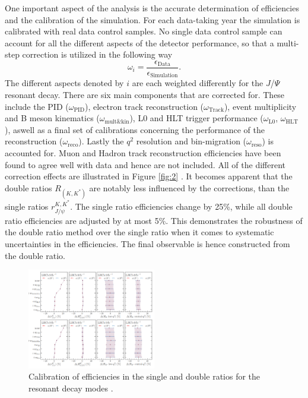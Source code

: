 \documentclass[%
 reprint,
 amsmath,amssymb,
 aps,
]{revtex4-2}
\begin{document}
One important aspect of the analysis is the accurate determination of efficiencies and the calibration of the simulation. For each data-taking year
the simulation is calibrated with real data control samples. No single data control sample can account for all the different aspects of the detector 
performance, so that a multi-step correction is utilized \cite{hier1,hier2} in the following way
\begin{equation*}
\omega_i = \frac{\epsilon_{\text{Data}}}{\epsilon_{\text{Simulation}}}.
\end{equation*}
The different aspects denoted by $i$ are each weighted differently for the $J$/$\Psi$ resonant decay. There are six main components that are corrected for. These 
include the PID ($\omega_{\text{PID}}$), electron track reconstruction ($\omega_{\text{Track}}$), event multiplicity and B meson kinematics ($\omega_{\text{mult}\&\text{kin}}$),
 L0 and HLT trigger performance ($\omega_{\text{L}0}$, $\omega_{\text{HLT}}$), aswell as a final set of calibrations concerning the performance of the reconstruction ($\omega_{\text{reco}}$).
Lastly the $q^2$ resolution and bin-migration ($\omega_{\text{reso}}$) is accounted for.
Muon and Hadron track reconstruction efficiencies have been found to agree well with data and hence are not included. 
All of the different correction effects are illustrated in Figure \ref{fig:2} . It becomes apparent that the double ratios $R_{\left(K, K^*\right)}$ are notably
less influenced by the corrections, than the single ratios  $r_{J / \psi}^{K, K^*}$. The single ratio efficiencies change by 25\%, while
all double ratio efficiencies are adjusted by at most 5\%.
This demonstrates the robustness of the double ratio method over the single ratio when it comes to systematic
uncertainties in the efficiencies. The final observable is hence constructed from the double ratio.
\begin{figure}
    \centering
    \includegraphics[width=0.5\textwidth]{eff.png}
    \caption{Calibration of efficiencies in the single and double ratios for the resonant decay modes \cite{lhcbcollaboration2022measurement}.}
    \label{fig:3}
\end{figure}
\end{document}
